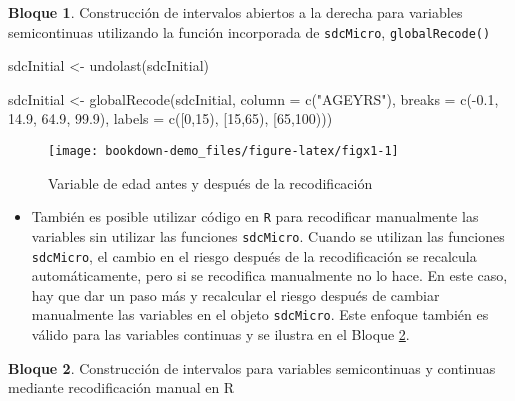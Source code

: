 \documentclass[
]{book}
\newenvironment{Shaded}{\begin{snugshade}}{\end{snugshade}}
\newcommand{\AttributeTok}[1]{\textcolor[rgb]{0.77,0.63,0.00}{#1}}
\newcommand{\FloatTok}[1]{\textcolor[rgb]{0.00,0.00,0.81}{#1}}
\newcommand{\FunctionTok}[1]{\textcolor[rgb]{0.00,0.00,0.00}{#1}}
\newcommand{\NormalTok}[1]{#1}
\newcommand{\OtherTok}[1]{\textcolor[rgb]{0.56,0.35,0.01}{#1}}
\newcommand{\SpecialCharTok}[1]{\textcolor[rgb]{0.00,0.00,0.00}{#1}}
\newcommand{\StringTok}[1]{\textcolor[rgb]{0.31,0.60,0.02}{#1}}
\providecommand{\tightlist}{%
  \setlength{\itemsep}{0pt}\setlength{\parskip}{0pt}}
\theoremstyle{definition}
\theoremstyle{definition}
\newtheorem{example}{Bloque}[chapter]
\theoremstyle{definition}
\theoremstyle{definition}
\theoremstyle{remark}
\begin{document}
\begin{example}
\protect\hypertarget{exm:bloque18jgm}{}\label{exm:bloque18jgm}Construcción de intervalos abiertos a la derecha para variables semicontinuas utilizando la función incorporada de \texttt{sdcMicro}, \texttt{globalRecode()}
\end{example}

\begin{Shaded}
\begin{Highlighting}[]
\NormalTok{sdcInitial }\OtherTok{\textless{}{-}} \FunctionTok{undolast}\NormalTok{(sdcInitial)}

\NormalTok{sdcInitial }\OtherTok{\textless{}{-}} \FunctionTok{globalRecode}\NormalTok{(sdcInitial, }\AttributeTok{column =} \FunctionTok{c}\NormalTok{(}\StringTok{"AGEYRS"}\NormalTok{),}
                           \AttributeTok{breaks =} \FunctionTok{c}\NormalTok{(}\SpecialCharTok{{-}}\FloatTok{0.1}\NormalTok{, }\FloatTok{14.9}\NormalTok{, }\FloatTok{64.9}\NormalTok{, }\FloatTok{99.9}\NormalTok{),}
                           \AttributeTok{labels =} \FunctionTok{c}\NormalTok{(}\StringTok{\textquotesingle{}[0,15)\textquotesingle{}}\NormalTok{, }\StringTok{\textquotesingle{}[15,65)\textquotesingle{}}\NormalTok{, }\StringTok{\textquotesingle{}[65,100)\textquotesingle{}}\NormalTok{))}
\end{Highlighting}
\end{Shaded}

\begin{figure}
\texttt{[image: bookdown-demo\_files/figure-latex/figx1-1]} \caption{Variable de edad antes y después de la recodificación}\label{fig:figx1}
\end{figure}

\begin{itemize}
\tightlist
\item
  También es posible utilizar código en \texttt{R} para recodificar manualmente las variables sin utilizar las funciones \texttt{sdcMicro}. Cuando se utilizan las funciones \texttt{sdcMicro}, el cambio en el riesgo después de la recodificación se recalcula automáticamente, pero si se recodifica manualmente no lo hace. En este caso, hay que dar un paso más y recalcular el riesgo después de cambiar manualmente las variables en el objeto \texttt{sdcMicro}. Este enfoque también es válido para las variables continuas y se ilustra en el Bloque \ref{exm:bloque19jgm}.
\end{itemize}

\begin{example}
\protect\hypertarget{exm:bloque19jgm}{}\label{exm:bloque19jgm}Construcción de intervalos para variables semicontinuas y continuas mediante recodificación manual en R
\end{example}
\end{document}

